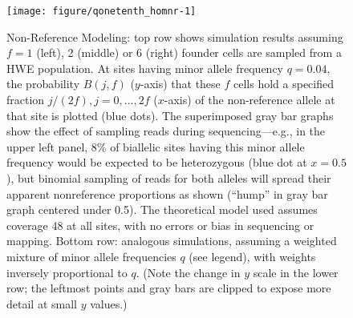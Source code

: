 \documentclass{article}\usepackage[]{graphicx}\usepackage[]{color}
\makeatletter
\def\maxwidth{ %
  \ifdim\Gin@nat@width>\linewidth
    \linewidth
  \else
    \Gin@nat@width
  \fi
}
\newenvironment{knitrout}{}{} %
\makeatother
\begin{document}
\newif\ifbitonic\bitonicfalse
\ifbitonic
{\footnotesize
\emph{Here's an earlier, weaker proof (proves U-shaped, but doesn't prove convexity).  Flip bitonic switch to false to hide in supplement but keep the text, in case...}

We formally verify for each $f\ge1$ that $B(j,f)$ is a ``U''-shaped function of $j$ as follows. 
Specifically, we show that if $q \le 1/(4f+1)$ 
then $B(j,f)/B(j+1,f) \ge 1$ for each $0 \le j \le f$, and
     $B(j,f)/B(j+1,f) \le 1$ for each $f < j < 2f$.
$$
  B(j,f) = p {{2f}\choose{j}} p^{2f-j} q^j + q {{2f}\choose{j}} p^j q^{2f-j} = 
          {{2f}\choose{j}} p^{2f+1} r^{-j} \left[r^{2j} + r^{2f+1}\right],
$$
where $r=q/p$. Then
\newcommand{\bratio}{{\frac{j+1}{2f-j} \left[\frac{r^{2j} + r^{2f+1}}{r^{2j+1} + r^{2f}}\right]}}
$$
  \frac{B(j,f)}{B(j+1,f)} = \bratio.
$$
Note that $r \le 1/(4f+1)/(1-1/(4f+1)) = 1/(4f) < 1$, so for $0 \le j < f$, we have $r^{2j+1}>r^{2f}$, and
$$
  \frac{B(j,f)}{B(j+1,f)} %
  \ge \frac{1}{2f} \left[\frac{r^{2j}}{2r^{2j+1}}\right] = \frac{1}{4fr} \ge 1.
$$
Similarly, when $f < j < 2f$, we have $r^{2j} < r^{2f+1}$, so
$$
  \frac{B(j,f)}{B(j+1,f)} %
  \le \frac{2f}{1} \left[\frac{2r^{2f+1}}{r^{2f}}\right] =  4fr \le 1.
$$
Finally, when $j=f$,
$$
  \frac{B(j,f)}{B(j+1,f)} %
  = \frac{f+1}{f} \left[\frac{r^{2f} + r^{2f+1}}{r^{2f+1} + r^{2f}}\right] = \frac{f+1}{f} > 1.
$$
A careful look at this proof shows that the minimum always occurs at $j=f+1$.
}
\fi



\begin{knitrout}\footnotesize
{}\color{fgcolor}\begin{figure}[t]
\texttt{[image: figure/qonetenth\_homnr-1]} \caption[Non-Reference Modeling]{Non-Reference Modeling: top row shows simulation results assuming $f=1$ (left), 2 (middle) or 6 (right) founder cells are sampled from a HWE population.  At sites having minor allele frequency $q=0.04,$ the probability $B(j,f)$ ($y$-axis) that these $f$ cells hold a specified fraction $j/(2f), j = 0, \ldots, 2f$ ($x$-axis) of the non-reference allele at that site is plotted (blue dots).  The superimposed gray bar graphs show the effect of sampling reads during sequencing---e.g., in the upper left panel, 8\% of biallelic sites having this minor allele frequency would be expected to be heterozygous (blue dot at $x=0.5$), but binomial sampling of reads for both alleles will spread their apparent nonreference proportions as shown (``hump'' in gray bar graph centered under 0.5). The theoretical model used assumes coverage 48 at all sites, with no errors or bias in sequencing or mapping.  Bottom row: analogous simulations, assuming a weighted mixture of minor allele frequencies $q$ (see legend), with weights inversely proportional to $q$.  (Note the change in $y$ scale in the lower row; the leftmost points and gray bars are clipped to expose more detail at small $y$ values.)}\label{fig:qonetenth.homnr}
\end{figure}


\end{knitrout}
\end{document}
